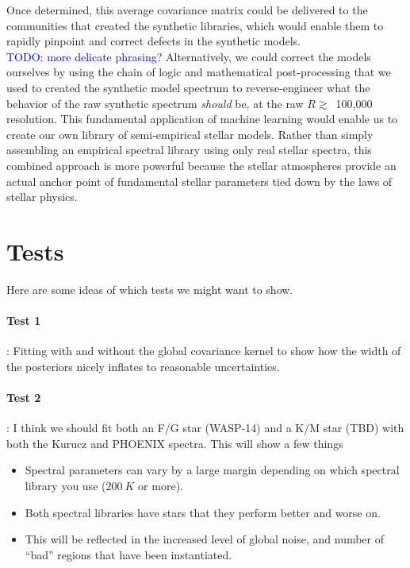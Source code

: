 \documentclass[preprint]{aastex} %
\newcommand{\todo}[1]{ \textcolor{Blue}{\\TODO: #1}}
\begin{document}
Once determined, this average covariance matrix could be delivered to the communities that created the synthetic libraries, which would enable them to rapidly pinpoint and correct defects in the synthetic models. \todo{more delicate phrasing?} Alternatively, we could correct the models ourselves by using the chain of logic and mathematical post-processing that we used to created the synthetic model spectrum to reverse-engineer what the behavior of the raw synthetic spectrum \emph{should} be, at the raw $R \gtrsim$~100,000 resolution. This fundamental application of machine learning would enable us to create our own library of semi-empirical stellar models. Rather than simply assembling an empirical spectral library using only real stellar spectra, this combined approach is more powerful because the stellar atmospheres provide an actual anchor point of fundamental stellar parameters tied down by the laws of stellar physics.

\section{Tests}
Here are some ideas of which tests we might want to show.

\paragraph{Test 1}: Fitting with and without the global covariance kernel to show how the width of the posteriors nicely inflates to reasonable uncertainties.

\paragraph{Test 2}: I think we should fit both an F/G star (WASP-14) and a K/M star (TBD) with both the Kurucz and PHOENIX spectra. This will show a few things
\begin{itemize}
  \item Spectral parameters can vary by a large margin depending on which spectral library you use ($200~K$ or more).
  \item Both spectral libraries have stars that they perform better and worse on.
  \item This will be reflected in the increased level of global noise, and number of ``bad'' regions that have been instantiated.
\end{itemize}



\end{document}
